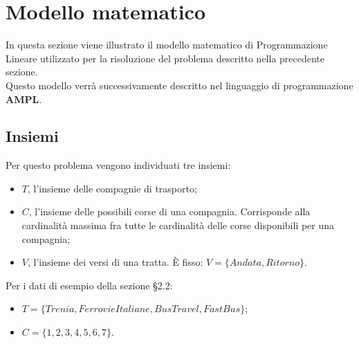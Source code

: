 \documentclass[main.tex]{subfiles}
\begin{document}
\section{Modello matematico}
In questa sezione viene illustrato il modello matematico di Programmazione Lineare utilizzato per la risoluzione del problema descritto nella precedente sezione.\\
Questo modello verrà successivamente descritto nel linguaggio di programmazione \textbf{AMPL}.

\subsection*{Insiemi}
Per questo problema vengono individuati tre insiemi:
\begin{itemize}
    \item $T$, l'insieme delle compagnie di trasporto;
    \item $C$, l'insieme delle possibili corse di una compagnia. Corrisponde alla cardinalità massima fra tutte le cardinalità delle corse disponibili per una compagnia;
    \item $V$, l'insieme dei versi di una tratta. È fisso: $V = \{Andata, Ritorno \}$.
\end{itemize}
Per i dati di esempio della sezione §2.2:
\begin{itemize}
    \item $T = \{Trenia, FerrovieItaliane, BusTravel, FastBus\}$;
    \item $C = \{1, 2, 3, 4, 5, 6, 7\}$.
\end{itemize}
\end{document}
